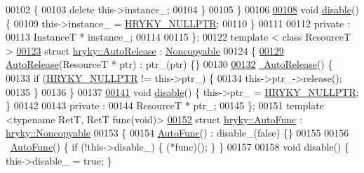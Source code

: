 \begin{DoxyCode}
00102         \{
00103             \textcolor{keyword}{delete} this->instance\_;
00104         \}
00105     \}
00106 
\hypertarget{raii_8h_source_l00108}{}\hyperlink{classhryky_1_1_auto_delete_acd5b8c66807b7eb7bd60e943e06ad899}{00108}     \textcolor{keywordtype}{void} \hyperlink{classhryky_1_1_auto_delete_acd5b8c66807b7eb7bd60e943e06ad899}{disable}() \{
00109         this->instance\_ = \hyperlink{common_8h_a4cd4ac09cfcdbd6b30ee69afc156e210}{HRYKY_NULLPTR};
00110     \}
00111 
00112 \textcolor{keyword}{private} :
00113     InstanceT * instance\_;
00114 
00115 \};
00122 \textcolor{keyword}{template} < \textcolor{keyword}{class} ResourceT >
\hypertarget{raii_8h_source_l00123}{}\hyperlink{structhryky_1_1_auto_release}{00123} \textcolor{keyword}{struct }\hyperlink{structhryky_1_1_auto_release}{hryky::AutoRelease} : \hyperlink{classhryky_1_1_noncopyable}{Noncopyable}
00124 \{
\hypertarget{raii_8h_source_l00129}{}\hyperlink{structhryky_1_1_auto_release_a2ca03b9a40a76106b96a3b112e470a15}{00129}     \hyperlink{structhryky_1_1_auto_release_a2ca03b9a40a76106b96a3b112e470a15}{AutoRelease}(ResourceT * ptr) : ptr\_(ptr) \{\}
00130     
\hypertarget{raii_8h_source_l00132}{}\hyperlink{structhryky_1_1_auto_release_ac8b9d3b97aeb9bc2c27783161e2df552}{00132}     \hyperlink{structhryky_1_1_auto_release_ac8b9d3b97aeb9bc2c27783161e2df552}{~AutoRelease}() \{
00133         \textcolor{keywordflow}{if} (\hyperlink{common_8h_a4cd4ac09cfcdbd6b30ee69afc156e210}{HRYKY_NULLPTR} != this->ptr\_) \{
00134             this->ptr\_->release();
00135         \}
00136     \}
00137     
\hypertarget{raii_8h_source_l00141}{}\hyperlink{structhryky_1_1_auto_release_ac65949fad34210bc5e981daadf36fab1}{00141}     \textcolor{keywordtype}{void} \hyperlink{structhryky_1_1_auto_release_ac65949fad34210bc5e981daadf36fab1}{disable}() \{ this->ptr\_ = \hyperlink{common_8h_a4cd4ac09cfcdbd6b30ee69afc156e210}{HRYKY_NULLPTR}; \}
00142     
00143 \textcolor{keyword}{private} :
00144     ResourceT * ptr\_;
00145 \};
00151 \textcolor{keyword}{template} <\textcolor{keyword}{typename} RetT, RetT func(\textcolor{keywordtype}{void})>
\hypertarget{raii_8h_source_l00152}{}\hyperlink{structhryky_1_1_auto_func}{00152} \textcolor{keyword}{struct }\hyperlink{structhryky_1_1_auto_func}{hryky::AutoFunc} : \hyperlink{classhryky_1_1_noncopyable}{hryky::Noncopyable}
00153 \{
00154     \hyperlink{structhryky_1_1_auto_func}{AutoFunc}() : disable\_(\textcolor{keyword}{false}) \{\}
00155     
00156     ~\hyperlink{structhryky_1_1_auto_func}{AutoFunc}() \{ \textcolor{keywordflow}{if} (!this->disable\_) \{ (*func)(); \} \}
00157 
00158     \textcolor{keywordtype}{void} disable() \{ this->disable\_ = \textcolor{keyword}{true}; \}

\end{DoxyCode}
